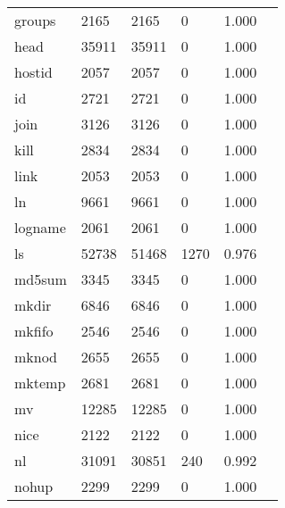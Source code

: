 \begin{longtable}{lp{2.20cm}p{2.20cm}p{2.20cm}p{2.20cm}p{2.20cm}}
groups    &                     2165 &         2165 &             0 &                    1.000 \\
head      &                    35911 &        35911 &             0 &                    1.000 \\
hostid    &                     2057 &         2057 &             0 &                    1.000 \\
id        &                     2721 &         2721 &             0 &                    1.000 \\
join      &                     3126 &         3126 &             0 &                    1.000 \\
kill      &                     2834 &         2834 &             0 &                    1.000 \\
link      &                     2053 &         2053 &             0 &                    1.000 \\
ln        &                     9661 &         9661 &             0 &                    1.000 \\
logname   &                     2061 &         2061 &             0 &                    1.000 \\
ls        &                    52738 &        51468 &          1270 &                    0.976 \\
md5sum    &                     3345 &         3345 &             0 &                    1.000 \\
mkdir     &                     6846 &         6846 &             0 &                    1.000 \\
mkfifo    &                     2546 &         2546 &             0 &                    1.000 \\
mknod     &                     2655 &         2655 &             0 &                    1.000 \\
mktemp    &                     2681 &         2681 &             0 &                    1.000 \\
mv        &                    12285 &        12285 &             0 &                    1.000 \\
nice      &                     2122 &         2122 &             0 &                    1.000 \\
nl        &                    31091 &        30851 &           240 &                    0.992 \\
nohup     &                     2299 &         2299 &             0 &                    1.000 \\

\end{longtable}
